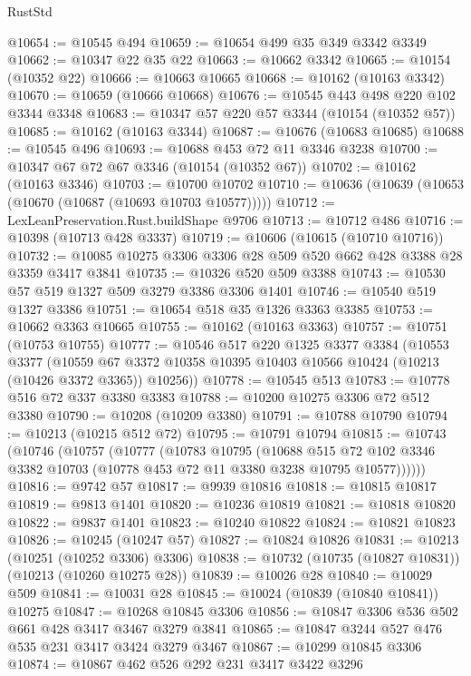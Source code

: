 \begin{lexlean}{RustStd}
\begin{coremodule}
{\begin{coremodule}
{{{{{{{{{{{{{{{{{{{{{{{{{{@10654 := @10545 @494
@10659 := @10654 @499 @35 @349 @3342 @3349
@10662 := @10347 @22 @35 @22
@10663 := @10662 @3342
@10665 := @10154 (@10352 @22)
@10666 := @10663 @10665
@10668 := @10162 (@10163 @3342)
@10670 := @10659 (@10666 @10668)
@10676 := @10545 @443 @498 @220 @102 @3344 @3348
@10683 := @10347 @57 @220 @57 @3344 (@10154 (@10352 @57))
@10685 := @10162 (@10163 @3344)
@10687 := @10676 (@10683 @10685)
@10688 := @10545 @496
@10693 := @10688 @453 @72 @11 @3346 @3238
@10700 := @10347 @67 @72 @67 @3346 (@10154 (@10352 @67))
@10702 := @10162 (@10163 @3346)
@10703 := @10700 @10702
@10710 := @10636 (@10639 (@10653 (@10670 (@10687 (@10693 @10703 @10577)))))
@10712 := LexLeanPreservation.Rust.buildShape @9706
@10713 := @10712 @486
@10716 := @10398 (@10713 @428 @3337)
@10719 := @10606 (@10615 (@10710 @10716))
@10732 := @10085 @10275 @3306 @3306 @28 @509 @520 @662 @428 @3388 @28 @3359 @3417 @3841
@10735 := @10326 @520 @509 @3388
@10743 := @10530 @57 @519 @1327 @509 @3279 @3386 @3306 @1401
@10746 := @10540 @519 @1327 @3386
@10751 := @10654 @518 @35 @1326 @3363 @3385
@10753 := @10662 @3363 @10665
@10755 := @10162 (@10163 @3363)
@10757 := @10751 (@10753 @10755)
@10777 := @10546
    @517
    @220
    @1325
    @3377
    @3384
    (@10553
      @3377
      (@10559 @67 @3372 @10358 @10395 @10403 @10566 @10424 (@10213 (@10426 @3372 @3365)) @10256))
@10778 := @10545 @513
@10783 := @10778 @516 @72 @337 @3380 @3383
@10788 := @10200 @10275 @3306 @72 @512 @3380
@10790 := @10208 (@10209 @3380)
@10791 := @10788 @10790
@10794 := @10213 (@10215 @512 @72)
@10795 := @10791 @10794
@10815 := @10743
    (@10746
      (@10757
        (@10777
          (@10783
            @10795
            (@10688
              @515
              @72
              @102
              @3346
              @3382
              @10703
              (@10778 @453 @72 @11 @3380 @3238 @10795 @10577))))))
@10816 := @9742 @57
@10817 := @9939 @10816
@10818 := @10815 @10817
@10819 := @9813 @1401
@10820 := @10236 @10819
@10821 := @10818 @10820
@10822 := @9837 @1401
@10823 := @10240 @10822
@10824 := @10821 @10823
@10826 := @10245 (@10247 @57)
@10827 := @10824 @10826
@10831 := @10213 (@10251 (@10252 @3306) @3306)
@10838 := @10732 (@10735 (@10827 @10831)) (@10213 (@10260 @10275 @28))
@10839 := @10026 @28
@10840 := @10029 @509
@10841 := @10031 @28
@10845 := @10024 (@10839 (@10840 @10841)) @10275
@10847 := @10268 @10845 @3306
@10856 := @10847 @3306 @536 @502 @661 @428 @3417 @3467 @3279 @3841
@10865 := @10847 @3244 @527 @476 @535 @231 @3417 @3424 @3279 @3467
@10867 := @10299 @10845 @3306
@10874 := @10867 @462 @526 @292 @231 @3417 @3422 @3296
}}}}}}}}}}}}}}}}}}}}}}}}}}
\end{coremodule}}
\end{coremodule}
\end{lexlean}
